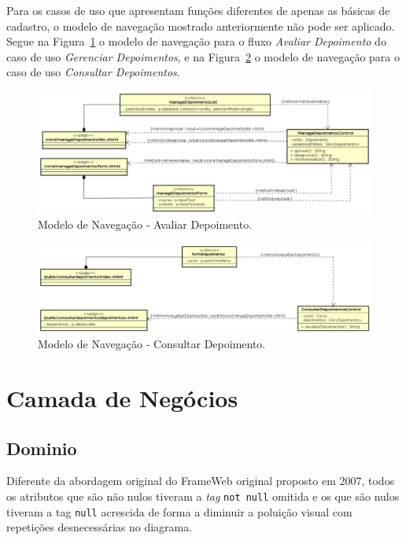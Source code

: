 Para os casos de uso que apresentam funções diferentes de apenas as básicas de cadastro, o modelo de navegação mostrado anteriormente não pode ser aplicado. Segue na Figura~\ref{figura-modelo-view-analisar-depoimento} o modelo de navegação para o fluxo \emph{Avaliar Depoimento} do caso de uso \emph{Gerenciar Depoimentos}, e na Figura~\ref{figura-modelo-view-consultar-depoimento} o modelo de navegação para o caso de uso \emph{Consultar Depoimentos}.

\begin{figure}[h]
  \centering
  \includegraphics[width=1\textwidth]{figuras/analisarDepoimento}
  \caption{Modelo de Navegação - Avaliar Depoimento.}
  \label{figura-modelo-view-analisar-depoimento}
\end{figure}

\begin{figure}[h]
  \centering
  \includegraphics[width=1\textwidth]{figuras/consultarDepoimento}
  \caption{Modelo de Navegação - Consultar Depoimento.}
  \label{figura-modelo-view-consultar-depoimento}
\end{figure} 



\section{Camada de Negócios }

\subsection{Dominio}
Diferente da abordagem original do FrameWeb original proposto em 2007, todos os atributos que são não nulos tiveram a \textit{tag} \texttt{not null} omitida e os que são nulos tiveram a tag \texttt{null} acrescida de forma a diminuir a poluição visual com repetições desnecessárias no diagrama.

